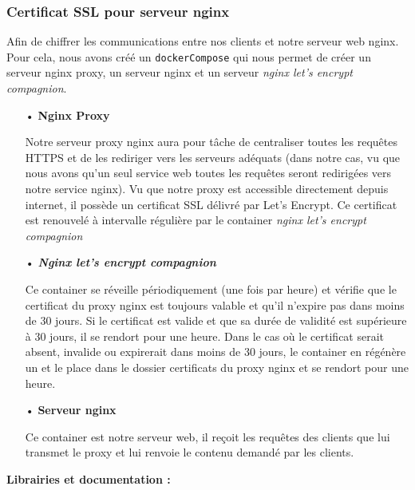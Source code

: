 \documentclass[12pt]{article}
\begin{document}
\subsubsection{Certificat SSL pour serveur nginx}

Afin de chiffrer les communications entre nos clients et notre serveur web nginx.
Pour cela, nous avons créé un \texttt{dockerCompose} qui nous permet de créer un serveur nginx proxy, un serveur nginx et un serveur \emph{nginx let's encrypt compagnion}.
\medskip

\begin{itemize}

\item[•] \textbf{Nginx Proxy}
\vspace{1mm}

Notre serveur proxy nginx aura pour tâche de centraliser toutes les requêtes HTTPS et de les rediriger vers les serveurs adéquats (dans notre cas, vu que nous avons qu'un seul service web toutes les requêtes seront redirigées vers notre service nginx).
Vu que notre proxy est accessible directement depuis internet, il possède un certificat SSL délivré par Let's Encrypt.
Ce certificat est renouvelé à intervalle régulière par le container \emph{nginx let's encrypt compagnion}
\vspace{3mm}

\item[•] \textbf{\emph{Nginx let's encrypt compagnion}}
\vspace{1mm}

Ce container se réveille périodiquement (une fois par heure) et vérifie que le certificat du proxy nginx est toujours valable et qu'il n'expire pas dans moins de 30 jours.
Si le certificat est valide et que sa durée de validité est supérieure à 30 jours, il se rendort pour une heure.
Dans le cas où le certificat serait absent, invalide ou expirerait dans moins de 30 jours, le container en régénère un et le place dans le dossier certificats du proxy nginx et se rendort pour une heure.
\vspace{3mm}

\item[•] \textbf{Serveur nginx}
\vspace{1mm}

Ce container est notre serveur web, il reçoit les requêtes des clients que lui transmet le proxy et lui renvoie le contenu demandé par les clients.
\end{itemize}

\medskip
\textbf{Librairies et documentation :}
\end{document}
